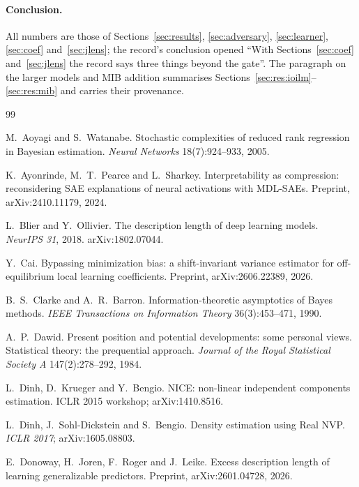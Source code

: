 \documentclass[11pt,a4paper]{article}
\newcommand{\unv}{}
\begin{document}
\paragraph{Conclusion.} All numbers are those of Sections~\ref{sec:results}, \ref{sec:adversary}, \ref{sec:learner}, \ref{sec:coef} and~\ref{sec:jlens}; the record's conclusion opened ``With Sections~\ref{sec:coef} and~\ref{sec:jlens} the record says three things beyond the gate''. The paragraph on the larger models and MIB addition summarises Sections~\ref{sec:res:ioilm}--\ref{sec:res:mib} and carries their provenance.
\begin{thebibliography}{99}

 M.~Aoyagi and S.~Watanabe. Stochastic
complexities of reduced rank regression in Bayesian estimation.
\emph{Neural Networks} 18(7):924--933, 2005.

\bibitem{ayonrinde2024}\unv{} K.~Ayonrinde, M.~T.~Pearce and L.~Sharkey.
Interpretability as compression: reconsidering SAE explanations of neural
activations with MDL-SAEs. Preprint, arXiv:2410.11179, 2024.

 L.~Blier and Y.~Ollivier. The description
length of deep learning models. \emph{NeurIPS 31}, 2018. arXiv:1802.07044.

 Y.~Cai. Bypassing minimization bias: a shift-invariant
variance estimator for off-equilibrium local learning coefficients.
Preprint, arXiv:2606.22389, 2026.

 B.~S.~Clarke and A.~R.~Barron.
Information-theoretic asymptotics of Bayes methods. \emph{IEEE
Transactions on Information Theory} 36(3):453--471, 1990.

 A.~P.~Dawid. Present position and potential
developments: some personal views. Statistical theory: the prequential
approach. \emph{Journal of the Royal Statistical Society A}
147(2):278--292, 1984.

\bibitem{dinh2015}\unv{} L.~Dinh, D.~Krueger and Y.~Bengio. NICE: non-linear
independent components estimation. ICLR 2015 workshop; arXiv:1410.8516.

\bibitem{dinh2017}\unv{} L.~Dinh, J.~Sohl-Dickstein and S.~Bengio. Density
estimation using Real NVP. \emph{ICLR 2017}; arXiv:1605.08803.

 E.~Donoway, H.~Joren, F.~Roger and J.~Leike. Excess
description length of learning generalizable predictors. Preprint,
arXiv:2601.04728, 2026.


\end{thebibliography}
\end{document}
